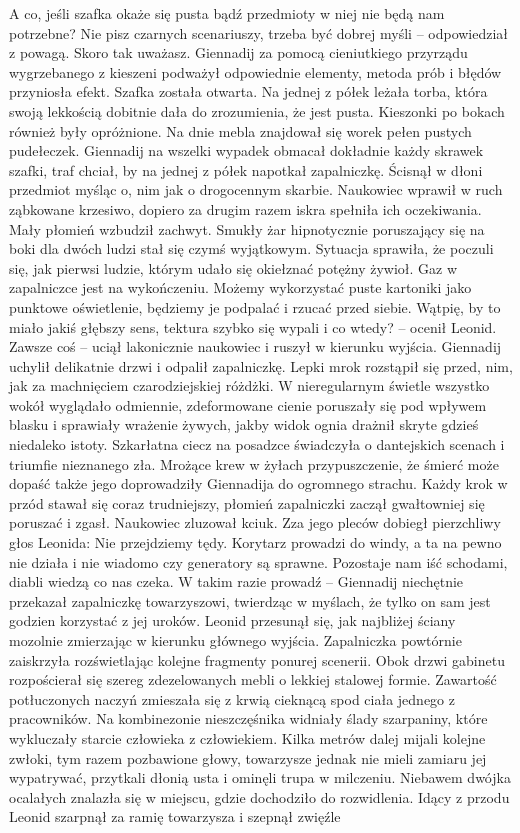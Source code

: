 \documentclass[../MAIN.tex]{subfiles}
\begin{document}
\sx A co, jeśli szafka okaże się pusta bądź przedmioty w niej nie będą nam potrzebne? 
\xx Nie pisz czarnych scenariuszy, trzeba być dobrej myśli -- odpowiedział z powagą. 
\xx Skoro tak uważasz. 
\qd
Giennadij za pomocą cieniutkiego przyrządu wygrzebanego z kieszeni podważył odpowiednie elementy, metoda prób i błędów przyniosła efekt. Szafka została otwarta. Na jednej z półek leżała torba, która swoją lekkością dobitnie dała do zrozumienia, że jest pusta. Kieszonki po bokach również były opróżnione. Na dnie mebla znajdował się worek pełen pustych pudełeczek. Giennadij na wszelki wypadek obmacał dokładnie każdy skrawek szafki, traf chciał, by na jednej z półek napotkał zapalniczkę. Ścisnął w dłoni przedmiot myśląc o, nim jak o drogocennym skarbie. Naukowiec wprawił w ruch ząbkowane krzesiwo, dopiero za drugim razem iskra spełniła ich oczekiwania. Mały płomień wzbudził zachwyt. Smukły żar hipnotycznie poruszający się na boki dla dwóch ludzi stał się czymś wyjątkowym. Sytuacja sprawiła, że poczuli się, jak pierwsi ludzie, którym udało się okiełznać potężny żywioł. 
\sx Gaz w zapalniczce jest na wykończeniu. Możemy wykorzystać puste kartoniki jako punktowe oświetlenie, będziemy je podpalać i rzucać przed siebie. 
\xx Wątpię, by to miało jakiś głębszy sens, tektura szybko się wypali i co wtedy? -- ocenił Leonid. 
\xx Zawsze coś -- uciął lakonicznie naukowiec i ruszył w kierunku wyjścia. 
\qd
Giennadij uchylił delikatnie drzwi i odpalił zapalniczkę. Lepki mrok rozstąpił się przed, nim, jak za machnięciem czarodziejskiej różdżki. W nieregularnym świetle wszystko wokół wyglądało odmiennie, zdeformowane cienie poruszały się pod wpływem blasku i sprawiały wrażenie żywych, jakby widok ognia drażnił skryte gdzieś niedaleko istoty. Szkarłatna ciecz na posadzce świadczyła o dantejskich scenach i triumfie nieznanego zła. Mrożące krew w żyłach przypuszczenie, że śmierć może dopaść także jego doprowadziły Giennadija do ogromnego strachu. Każdy krok w przód stawał się coraz trudniejszy, płomień zapalniczki zaczął gwałtowniej się poruszać i zgasł. Naukowiec zluzował kciuk. Zza jego pleców dobiegł pierzchliwy głos Leonida: 
\sx Nie przejdziemy tędy. Korytarz prowadzi do windy, a ta na pewno nie działa i nie wiadomo czy generatory są sprawne. Pozostaje nam iść schodami, diabli wiedzą co nas czeka. 
\xx W takim razie prowadź -- Giennadij niechętnie przekazał zapalniczkę towarzyszowi, twierdząc w myślach, że tylko on sam jest godzien korzystać z jej uroków. 
\qd
Leonid przesunął się, jak najbliżej ściany mozolnie zmierzając w kierunku głównego wyjścia. Zapalniczka powtórnie zaiskrzyła rozświetlając kolejne fragmenty ponurej scenerii. Obok drzwi gabinetu rozpościerał się szereg zdezelowanych mebli o lekkiej stalowej formie. Zawartość potłuczonych naczyń zmieszała się z krwią cieknącą spod ciała jednego z pracowników. Na kombinezonie nieszczęśnika widniały ślady szarpaniny, które wykluczały starcie człowieka z człowiekiem. Kilka metrów dalej mijali kolejne zwłoki, tym razem pozbawione głowy, towarzysze jednak nie mieli zamiaru jej wypatrywać, przytkali dłonią usta i ominęli trupa w milczeniu. Niebawem dwójka ocalałych znalazła się w miejscu, gdzie dochodziło do rozwidlenia. Idący z przodu Leonid szarpnął za ramię towarzysza i szepnął zwięźle 
\end{document}
